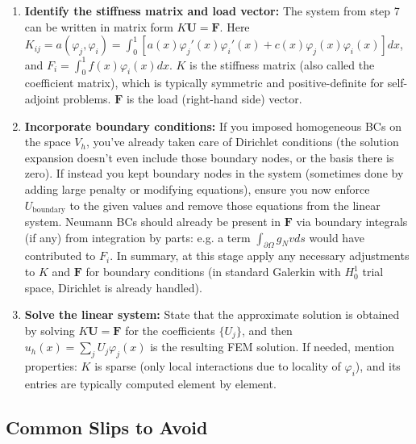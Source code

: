 \documentclass[a4paper,11pt]{report}
\begin{document}
\begin{enumerate}
    \item \textbf{Identify the stiffness matrix and load vector:} The system from step 7 can be written in matrix form $K \mathbf{U} = \mathbf{F}$. Here $K_{ij} = a(\varphi_j,\varphi_i) = \int_0^1 [a(x)\varphi_j'(x)\varphi_i'(x) + c(x)\varphi_j(x)\varphi_i(x)] dx$, and $F_i = \int_0^1 f(x) \varphi_i(x) dx$. $K$ is the stiffness matrix (also called the coefficient matrix), which is typically symmetric and positive-definite for self-adjoint problems. $\mathbf{F}$ is the load (right-hand side) vector.

    \item \textbf{Incorporate boundary conditions:} If you imposed homogeneous BCs on the space $V_h$, you've already taken care of Dirichlet conditions (the solution expansion doesn't even include those boundary nodes, or the basis there is zero). If instead you kept boundary nodes in the system (sometimes done by adding large penalty or modifying equations), ensure you now enforce $U_{\text{boundary}}$ to the given values and remove those equations from the linear system. Neumann BCs should already be present in $\mathbf{F}$ via boundary integrals (if any) from integration by parts: e.g. a term $\int_{\partial \Omega} g_N v ds$ would have contributed to $F_i$. In summary, at this stage apply any necessary adjustments to $K$ and $\mathbf{F}$ for boundary conditions (in standard Galerkin with $H_0^1$ trial space, Dirichlet is already handled).

    \item \textbf{Solve the linear system:} State that the approximate solution is obtained by solving $K \mathbf{U} = \mathbf{F}$ for the coefficients $\{U_j\}$, and then $u_h(x) = \sum_j U_j \varphi_j(x)$ is the resulting FEM solution. If needed, mention properties: $K$ is sparse (only local interactions due to locality of $\varphi_i$), and its entries are typically computed element by element.
\end{enumerate}

\subsection{Common Slips to Avoid}
\end{document}
